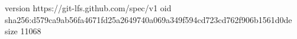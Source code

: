 version https://git-lfs.github.com/spec/v1
oid sha256:d579ca9ab56fa4671fd25a2649740a069a349f594cd723cd762f906b1561d0de
size 11068
